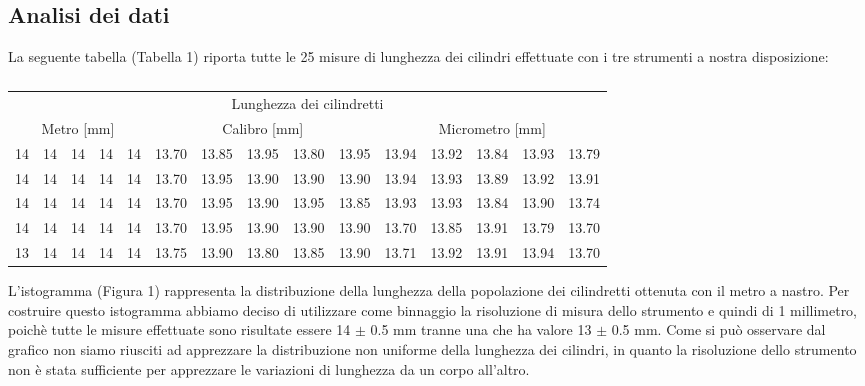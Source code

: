 \documentclass[12pt, twoside, a4paper]{article}
\begin{document}
	\subsection{Analisi dei dati}
La seguente tabella (Tabella 1) riporta tutte le 25 misure di lunghezza dei cilindri effettuate con i tre strumenti a nostra disposizione:

\begin{table}[tbh]
	\footnotesize
	\centering
	\begin{tabular} { c c c c c | c c c c c | c c c c c }
		\toprule
		\multicolumn{15}{c}{Lunghezza dei cilindretti} \\
		\multicolumn{5}{c}{Metro [mm]} & \multicolumn{5}{c}{Calibro [mm]} & \multicolumn{5}{c}{Micrometro [mm]} \\
		\midrule
		14 & 14 & 14 & 14 & 14 & 13.70 & 13.85 & 13.95 & 13.80 & 13.95 & 13.94 & 13.92 & 13.84 & 13.93 & 13.79 \\
		14 & 14 & 14 & 14 & 14 & 13.70 & 13.95 & 13.90 & 13.90 & 13.90 & 13.94 & 13.93 & 13.89 & 13.92 & 13.91 \\
		14 & 14 & 14 & 14 & 14 & 13.70 & 13.95 & 13.90 & 13.95 & 13.85 & 13.93 & 13.93 & 13.84 & 13.90 & 13.74 \\
		14 & 14 & 14 & 14 & 14 & 13.70 & 13.95 & 13.90 & 13.90 & 13.90 & 13.70 & 13.85 & 13.91 & 13.79 & 13.70 \\
		13 & 14 & 14 & 14 & 14 & 13.75 & 13.90 & 13.80 & 13.85 & 13.90 & 13.71 & 13.92 & 13.91 & 13.94 & 13.70 \\
	\bottomrule
	\end{tabular}
	\caption{}
\end{table}

L'istogramma (Figura 1) rappresenta la distribuzione della lunghezza della popolazione dei cilindretti ottenuta con il metro a nastro. Per costruire questo istogramma abbiamo deciso di utilizzare come binnaggio la risoluzione di misura dello strumento e quindi di 1 millimetro, poichè tutte le misure effettuate sono risultate essere 14 $\pm$ 0.5 mm tranne una che ha valore 13 $\pm$ 0.5 mm. Come si può osservare dal grafico non siamo riusciti ad apprezzare la distribuzione non uniforme della lunghezza dei cilindri, in quanto la risoluzione dello strumento non è stata sufficiente per apprezzare le variazioni di lunghezza da un corpo all'altro.
\end{document}

